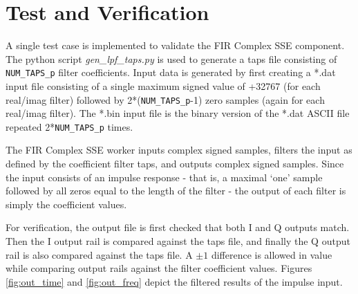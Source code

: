 
\section*{Test and Verification}


\begin{flushleft}
A single test case is implemented to validate the FIR Complex SSE component. The python script \textit{gen\_lpf\_taps.py} is used to generate a taps file consisting of \verb+NUM_TAPS_p+ filter coefficients. Input data is generated by first creating a *.dat input file consisting of a single maximum signed value of +32767 (for each real/imag filter) followed by 2*(\verb+NUM_TAPS_p+-1) zero samples (again for each real/imag filter). The *.bin input file is the binary version of the *.dat ASCII file repeated 2*\verb+NUM_TAPS_p+ times.\medskip

The FIR Complex SSE worker inputs complex signed samples, filters the input as defined by the coefficient filter taps, and outputs complex signed samples. Since the input consists of an impulse response - that is, a maximal `one' sample followed by all zeros equal to the length of the filter - the output of each filter is simply the coefficient values.\medskip

For verification, the output file is first checked that both I and Q outputs match. Then the I output rail is compared against the taps file, and finally the Q output rail is also compared against the taps file. A $\pm1$ difference is allowed in value while comparing output rails against the filter coefficient values. Figures \ref{fig:out_time} and \ref{fig:out_freq} depict the filtered results of the impulse input.
\end{flushleft}

